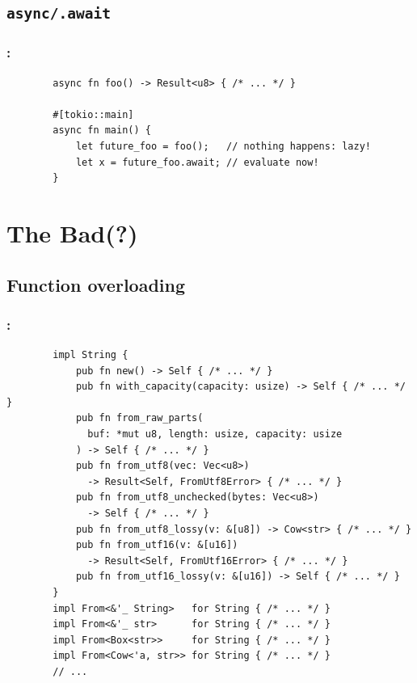 \documentclass[aspectratio=43, t]{beamer}
\begin{document}
\subsection{\texorpdfstring{\texttt{async/.await}}{async/.await}}
\begin{frame}[fragile]
	\frametitle{\secname: \subsecname}

	\begin{verbatim}
		async fn foo() -> Result<u8> { /* ... */ }

		#[tokio::main]
		async fn main() {
			let future_foo = foo();   // nothing happens: lazy!
			let x = future_foo.await; // evaluate now!
		}
	\end{verbatim}
\end{frame}

\section*{The Bad(?)}
\subsection*{Function overloading}
\begin{frame}[fragile]
	\frametitle{\secname: \subsecname}

	\begin{verbatim}
		impl String {
			pub fn new() -> Self { /* ... */ }
			pub fn with_capacity(capacity: usize) -> Self { /* ... */ }
			pub fn from_raw_parts(
			  buf: *mut u8, length: usize, capacity: usize
			) -> Self { /* ... */ }
			pub fn from_utf8(vec: Vec<u8>)
			  -> Result<Self, FromUtf8Error> { /* ... */ }
			pub fn from_utf8_unchecked(bytes: Vec<u8>)
			  -> Self { /* ... */ }
			pub fn from_utf8_lossy(v: &[u8]) -> Cow<str> { /* ... */ }
			pub fn from_utf16(v: &[u16])
			  -> Result<Self, FromUtf16Error> { /* ... */ }
			pub fn from_utf16_lossy(v: &[u16]) -> Self { /* ... */ }
		}
		impl From<&'_ String>   for String { /* ... */ }
		impl From<&'_ str>      for String { /* ... */ }
		impl From<Box<str>>     for String { /* ... */ }
		impl From<Cow<'a, str>> for String { /* ... */ }
		// ...
	\end{verbatim}
\end{frame}
\end{document}

